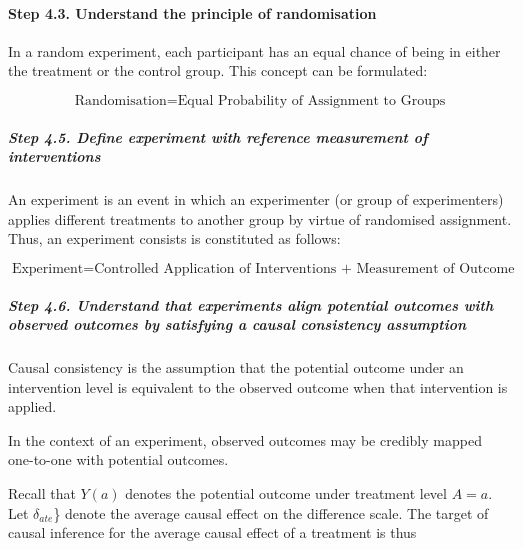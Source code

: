 \documentclass[
  singlecolumn]{article}
\let\oldparagraph\paragraph
\renewcommand{\paragraph}[1]{\oldparagraph{#1}\mbox{}}
\let\oldsubparagraph\subparagraph
\renewcommand{\subparagraph}[1]{\oldsubparagraph{#1}\mbox{}}
\begin{document}
\hypertarget{step-4.3.-understand-the-principle-of-randomisation}{%
\paragraph{\texorpdfstring{\textbf{Step 4.3. Understand the principle of
randomisation}}{Step 4.3. Understand the principle of randomisation}}\label{step-4.3.-understand-the-principle-of-randomisation}}

In a random experiment, each participant has an equal chance of being in
either the treatment or the control group. This concept can be
formulated:

\[
\text{Randomisation} = \text{Equal Probability of Assignment to Groups}
\]

\hypertarget{step-4.5.-define-experiment-with-reference-measurement-of-interventions}{%
\subparagraph{\texorpdfstring{\textbf{Step 4.5. Define experiment with
reference measurement of
interventions}}{Step 4.5. Define experiment with reference measurement of interventions}}\label{step-4.5.-define-experiment-with-reference-measurement-of-interventions}}

An experiment is an event in which an experimenter (or group of
experimenters) applies different treatments to another group by virtue
of randomised assignment. Thus, an experiment consists is constituted as
follows:

\[
\text{Experiment} = \text{Controlled Application of Interventions + Measurement of Outcome}
\]

\hypertarget{step-4.6.-understand-that-experiments-align-potential-outcomes-with-observed-outcomes-by-satisfying-a-causal-consistency-assumption}{%
\subparagraph{\texorpdfstring{\textbf{Step 4.6. Understand that
experiments align potential outcomes with observed outcomes by
satisfying a causal consistency
assumption}}{Step 4.6. Understand that experiments align potential outcomes with observed outcomes by satisfying a causal consistency assumption}}\label{step-4.6.-understand-that-experiments-align-potential-outcomes-with-observed-outcomes-by-satisfying-a-causal-consistency-assumption}}

Causal consistency is the assumption that the potential outcome under an
intervention level is equivalent to the observed outcome when that
intervention is applied.

In the context of an experiment, observed outcomes may be credibly
mapped one-to-one with potential outcomes.

Recall that \(Y(a)\) denotes the potential outcome under treatment level
\(A = a\). Let \(\delta_{ate}\)\} denote the average causal effect on
the difference scale. The target of causal inference for the average
causal effect of a treatment is thus
\end{document}
